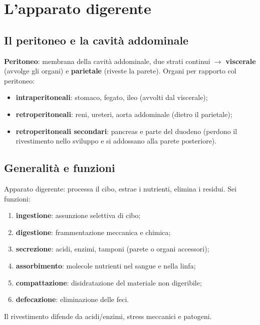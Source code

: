 \chapter{L'apparato digerente}

\section{Il peritoneo e la cavità addominale}

\textbf{Peritoneo}: membrana della cavità addominale, due strati continui $\rightarrow$
\textbf{viscerale} (avvolge gli organi) e \textbf{parietale} (riveste la parete). Organi per
rapporto col peritoneo:
\begin{itemize}
  \item \textbf{intraperitoneali}: stomaco, fegato, ileo (avvolti dal viscerale);
  \item \textbf{retroperitoneali}: reni, ureteri, aorta addominale (dietro il parietale);
  \item \textbf{retroperitoneali secondari}: pancreas e parte del duodeno (perdono il rivestimento
    nello sviluppo e si addossano alla parete posteriore).
\end{itemize}

\section{Generalità e funzioni}

Apparato digerente: processa il cibo, estrae i nutrienti, elimina i residui. Sei funzioni:
\begin{enumerate}
  \item \textbf{ingestione}: assunzione selettiva di cibo;
  \item \textbf{digestione}: frammentazione meccanica e chimica;
  \item \textbf{secrezione}: acidi, enzimi, tamponi (parete o organi accessori);
  \item \textbf{assorbimento}: molecole nutrienti nel sangue e nella linfa;
  \item \textbf{compattazione}: disidratazione del materiale non digeribile;
  \item \textbf{defecazione}: eliminazione delle feci.
\end{enumerate}
Il rivestimento difende da acidi/enzimi, stress meccanici e patogeni.

